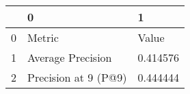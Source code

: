\begin{tabular}{lll}
\toprule
{} &                     0 &         1 \\
\midrule
0 &                Metric &     Value \\
1 &     Average Precision &  0.414576 \\
2 &  Precision at 9 (P@9) &  0.444444 \\
\bottomrule
\end{tabular}
